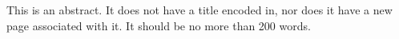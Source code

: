 This is an abstract. It does not have a title encoded in, nor does it have a new page associated with it. It should be no more than 200 words.
